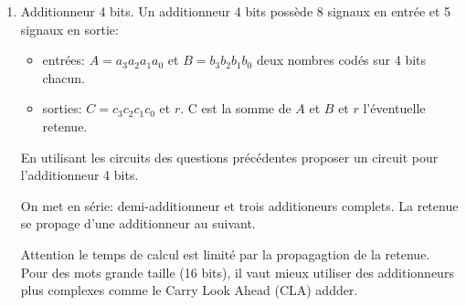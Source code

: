 \documentclass[a4paper,10pt]{exam}
\begin{document}
\begin{enumerate}
\begin{solution}
\end{solution}


\item Additionneur 4 bits. Un additionneur 4 bits possède 8 signaux en entrée et
  5 signaux en sortie:
  \begin{itemize}
    \item entrées: $A=a_3a_2a_1a_0$ et $B=b_3b_2b_1b_0$ deux nombres codés sur
      4 bits chacun.
    \item sorties: $C=c_3c_2c_1c_0$ et $r$. C est la somme de $A$ et $B$ et $r$
      l'éventuelle retenue.
  \end{itemize}
  En utilisant les circuits des questions précédentes proposer un circuit pour
  l'additionneur 4 bits.

\begin{solution}
    On met en série: demi-additionneur et trois additioneurs complets.
    La retenue se propage d'une additionneur au suivant.

    Attention le temps de calcul est limité par la propagagtion de la retenue. Pour des mots grande taille (16 bits), il vaut
    mieux utiliser des additionneurs plus complexes comme le Carry Look Ahead (CLA) addder.
\end{solution}
\end{enumerate}
\end{document}
